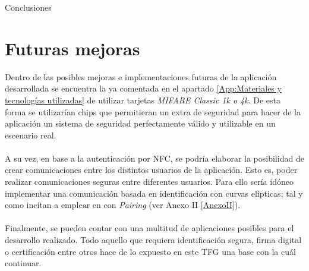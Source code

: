 \documentclass[../PFC.tex]{subfiles}
\begin{document}
Conclusiones

\section{Futuras mejoras}
\label{Futuras mejoras}

Dentro de las posibles mejoras e implementaciones futuras de la aplicación desarrollada se encuentra la ya comentada en el apartado \ref{App:Materiales y tecnologías utilizadas} de utilizar tarjetas \textit{MIFARE Classic 1k o 4k}. De esta forma se utilizarían chips que permitieran un extra de seguridad para hacer de la aplicación un sistema de seguridad perfectamente válido y utilizable en un escenario real.
\\\\
A su vez, en base a la autenticación por NFC, se podría elaborar la posibilidad de crear comunicaciones entre los distintos usuarios de la aplicación. Esto es, poder realizar comunicaciones seguras entre diferentes usuarios. Para ello sería idóneo implementar una comunicación basada en identificación con curvas elípticas; tal y como incitan a emplear en\cite{boneh2001identity} con \textit{Pairing}\cite{dupont2006provably} (ver Anexo II \ref{AnexoII}).
\\\\
Finalmente, se pueden contar con una multitud de aplicaciones posibles para el desarrollo realizado. Todo aquello que requiera identificación segura, firma digital o certificación entre otros hace de lo expuesto en este TFG una base con la cuál continuar.
\end{document}

